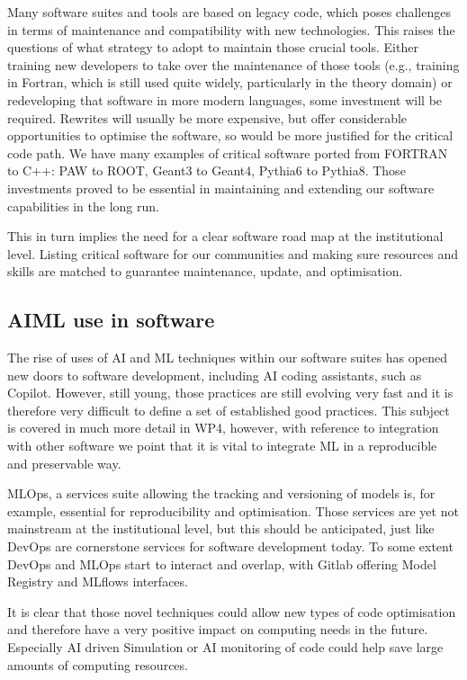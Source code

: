 Many software suites and tools are based on legacy code, which poses challenges in terms of maintenance and compatibility with new technologies. This raises the questions of what strategy to adopt to maintain those crucial tools. Either training new developers to take over the maintenance of those tools (e.g., training in Fortran, which is still used quite widely, particularly in the theory domain) or redeveloping that software in more modern languages, some investment will be required. Rewrites will usually be more expensive, but offer considerable opportunities to optimise the software, so would be more justified for the critical code path. We have many examples of critical software ported from FORTRAN to C++: PAW to ROOT, Geant3 to Geant4, Pythia6 to Pythia8. Those investments proved to be essential in maintaining and extending our software capabilities in the long run.

This in turn implies the need for a clear software road map at the institutional level. Listing critical software for our communities and making sure resources and skills are matched to guarantee maintenance, update, and optimisation.

\subsection{AI\/ML use in software}

The rise of uses of AI and ML techniques within our software suites has opened new doors to software development, including AI coding assistants, such as Copilot. However, still young, those practices are still evolving very fast and it is therefore very difficult to define a set of established good practices. This subject is covered in much more detail in WP4, however, with reference to integration with other software we point that it is vital to integrate ML in a reproducible and preservable way.

MLOps, a services suite allowing the tracking and versioning of models is, for example, essential for reproducibility and optimisation. Those services are yet not mainstream at the institutional level, but this should be anticipated, just like DevOps are cornerstone services for software development today. To some extent DevOps and MLOps start to interact and overlap, with Gitlab offering Model Registry and MLflows interfaces.

It is clear that those novel techniques could allow new types of code optimisation and therefore have a very positive impact on computing needs in the future. Especially AI driven Simulation or AI monitoring of code could help save large amounts of computing resources.


